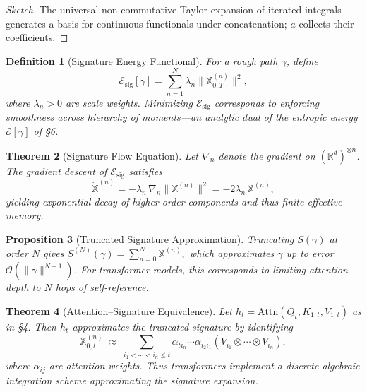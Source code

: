 \documentclass[12pt,a4paper,twoside,openright]{book}
\newtheorem{theorem}{Theorem}
\newtheorem{proposition}[theorem]{Proposition}
\newtheorem{definition}[theorem]{Definition}
\begin{document}
\begin{proof}[Sketch]
The universal non-commutative Taylor expansion of iterated integrals generates a basis for continuous functionals under concatenation; $a$ collects their coefficients.
\end{proof}

\begin{definition}[Signature Energy Functional]
For a rough path $\gamma$, define
\begin{equation}
\mathcal{E}_{\mathrm{sig}}[\gamma]
 = \sum_{n=1}^{N}
    \lambda_n \|\mathbb{X}^{(n)}_{0,T}\|^2,
\end{equation}
where $\lambda_n>0$ are scale weights.  
Minimizing $\mathcal{E}_{\mathrm{sig}}$ corresponds to enforcing smoothness across hierarchy of moments—an analytic dual of the entropic energy $\mathcal{E}[\gamma]$ of §6.
\end{definition}

\begin{theorem}[Signature Flow Equation]
Let $\nabla_n$ denote the gradient on $(\mathbb{R}^d)^{\otimes n}$.  
The gradient descent of $\mathcal{E}_{\mathrm{sig}}$ satisfies
\begin{equation}
\dot{\mathbb{X}}^{(n)} = -\lambda_n\,\nabla_n \|\mathbb{X}^{(n)}\|^2
  = -2\lambda_n\,\mathbb{X}^{(n)},
\end{equation}
yielding exponential decay of higher-order components and thus finite effective memory.
\end{theorem}

\begin{proposition}[Truncated Signature Approximation]
Truncating $S(\gamma)$ at order $N$ gives
\(
S^{(N)}(\gamma)=\sum_{n=0}^N\mathbb{X}^{(n)},
\)
which approximates $\gamma$ up to error $\mathcal{O}(\|\gamma\|^{N+1})$.
For transformer models, this corresponds to limiting attention depth to $N$ hops of self-reference.
\end{proposition}

\begin{theorem}[Attention--Signature Equivalence]
\label{thm:attn-sig}
Let $h_t=\text{Attn}(Q_t,K_{1:t},V_{1:t})$ as in §4.  
Then $h_t$ approximates the truncated signature by identifying
\[
\mathbb{X}^{(n)}_{0,t}
 \;\approx\;
  \sum_{i_1<\cdots<i_n\le t}
   \alpha_{t i_n}\!\cdots\!\alpha_{i_2 i_1}
   (V_{i_1}\!\otimes\!\cdots\!\otimes\!V_{i_n}),
\]
where $\alpha_{ij}$ are attention weights.  
Thus transformers implement a discrete algebraic integration scheme approximating the signature expansion.
\end{theorem}
\end{document}
